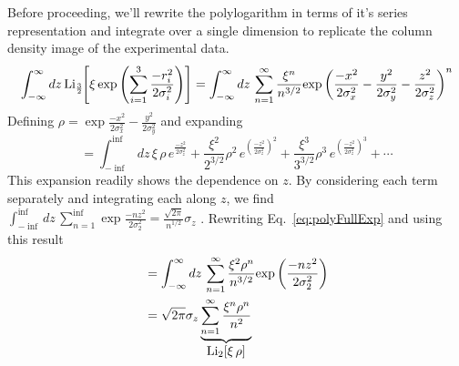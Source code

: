 Before proceeding, we'll rewrite the polylogarithm in terms of it's series representation and integrate over a single dimension to replicate the column density image of the experimental data.
\begin{equation}
	\int_{-\infty}^{\infty} dz\,\text{Li}_{\scriptscriptstyle\frac{3}{2}\!}\!\left[ \xi \,\text{exp}\left( {\sum_{i=1}^3 \frac{-r_i^2}{2\sigma_i^2}} \right) \right] = 
	\int_{-\infty}^{\infty} dz\, \sum_{n=1}^{\infty} \frac{\xi^n}{n^{3/2}}\text{exp}\left( {\frac{-x^2}{2\sigma_x^2} - \frac{y^2}{2\sigma_y^2} - \frac{z^2}{2\sigma_z^2}} \right)^n
\end{equation}
Defining $\rho=\exp{\frac{-x^2}{2\sigma_x^2} - \frac{y^2}{2\sigma_y^2}}$ and expanding
\begin{equation} \label{eq:polyFullExp}
	=\int_{-\inf}^{\inf} dz\, \xi\,\rho\,e^{\frac{-z^2}{2\sigma_z^2}} + 
 \frac{\xi^2}{2^{3/2}}\rho^2\,e^{\left(\frac{-z^2}{2\sigma_z^2}\right)^2} + 
 \frac{\xi^3}{3^{3/2}}\rho^3\,e^{\left(\frac{-z^2}{2\sigma_z^2}\right)^3} + \cdots
\end{equation}
This expansion readily shows the dependence on $z$. 
By considering each term separately and integrating each along $z$, we find $\displaystyle\int_{-\inf}^{\inf} dz\, \sum_{n=1}^{\inf}\exp{\frac{-n z^2}{2\sigma_2^2}} = \frac{\sqrt{2\pi}}{n^{1/2}}\sigma_z$ \cite{Ketterle1999, Gotlibovych2014}.
Rewriting Eq.\, \ref{eq:polyFullExp} and using this result
\begin{equation}
\begin{split}
	&=\int_{-\infty}^{\infty} dz\, \sum_{n=1}^{\infty}\frac{\xi^2\rho^n}{n^{3/2}}\text{exp}\left( {\frac{-n z^2}{2\sigma_2^2}} \right) \\
	&=\sqrt{2\pi}\sigma_z\underbrace{\sum_{n=1}^{\infty}\frac{\xi^n\rho^n}{n^2}}_{\displaystyle\text{Li}_{2}\!\left[ \xi\,\rho \right]}
\end{split}
\end{equation}

